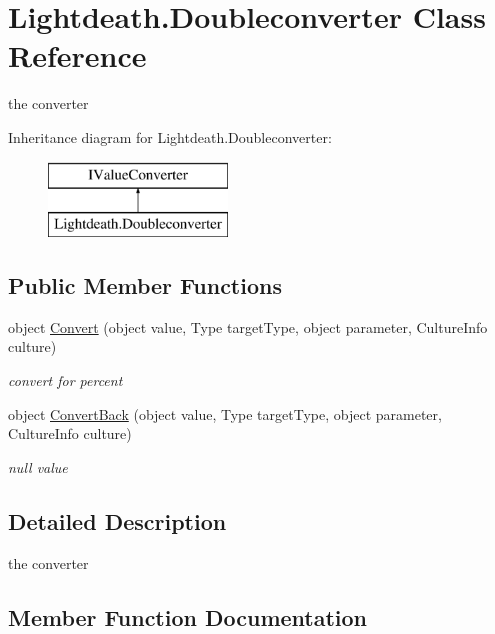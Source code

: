 \hypertarget{class_lightdeath_1_1_doubleconverter}{}\section{Lightdeath.\+Doubleconverter Class Reference}
\label{class_lightdeath_1_1_doubleconverter}


the converter  


Inheritance diagram for Lightdeath.\+Doubleconverter\+:\begin{figure}[H]
\begin{center}
\leavevmode
\includegraphics[height=2.000000cm]{class_lightdeath_1_1_doubleconverter}
\end{center}
\end{figure}
\subsection*{Public Member Functions}
\begin{DoxyCompactItemize}
\item 
object \hyperlink{class_lightdeath_1_1_doubleconverter_ad6b054db2a24eda4d173addb06972289}{Convert} (object value, Type target\+Type, object parameter, Culture\+Info culture)
\begin{DoxyCompactList}\small\item\em convert for percent \end{DoxyCompactList}\item 
object \hyperlink{class_lightdeath_1_1_doubleconverter_ab5cfe83689a102b4abc72964d5d75316}{Convert\+Back} (object value, Type target\+Type, object parameter, Culture\+Info culture)
\begin{DoxyCompactList}\small\item\em null value \end{DoxyCompactList}\end{DoxyCompactItemize}


\subsection{Detailed Description}
the converter 



\subsection{Member Function Documentation}
\hypertarget{class_lightdeath_1_1_doubleconverter_ad6b054db2a24eda4d173addb06972289}{}\label{class_lightdeath_1_1_doubleconverter_ad6b054db2a24eda4d173addb06972289} 
